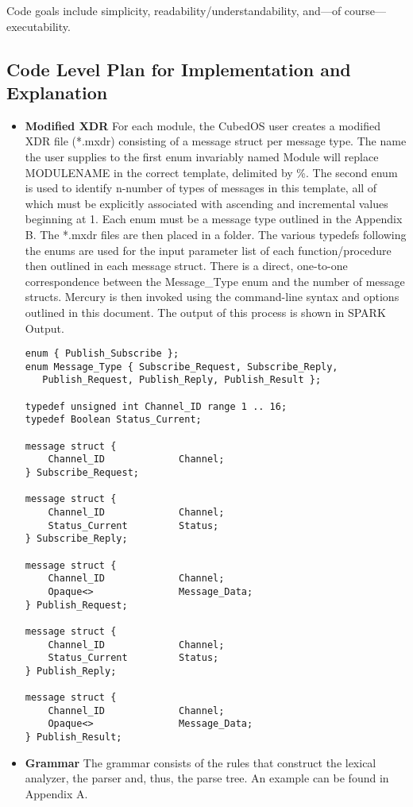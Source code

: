 Code goals include simplicity, readability/understandability, and—of course—executability.

\subsection{Code Level Plan for Implementation and Explanation}

\begin{itemize}
\item \textbf{Modified XDR} For each module, the CubedOS user creates a modified XDR file
(*.mxdr) consisting of a message struct per message type. The name the user supplies to the
first enum invariably named Module will replace MODULENAME in the correct template, delimited by
\%. The second enum is used to identify n-number of types of messages in this template, all of
which must be explicitly associated with ascending and incremental values beginning at 1. Each
enum must be a message type outlined in the Appendix B. The *.mxdr files are then placed in a
folder. The various typedefs following the enums are used for the input parameter list of each
function/procedure then outlined in each message struct. There is a direct, one-to-one
correspondence between the Message\_Type enum and the number of message structs. Mercury is then
invoked using the command-line syntax and options outlined in this document. The output of this
process is shown in SPARK Output.
\begin{verbatim}
enum { Publish_Subscribe };
enum Message_Type { Subscribe_Request, Subscribe_Reply, 
   Publish_Request, Publish_Reply, Publish_Result };

typedef unsigned int Channel_ID range 1 .. 16;
typedef Boolean Status_Current;

message struct {
    Channel_ID             Channel;
} Subscribe_Request;

message struct {
    Channel_ID             Channel;
    Status_Current         Status;
} Subscribe_Reply;

message struct {
    Channel_ID             Channel;
    Opaque<>               Message_Data;
} Publish_Request;

message struct {
    Channel_ID             Channel;
    Status_Current         Status;
} Publish_Reply;

message struct {
    Channel_ID             Channel;
    Opaque<>               Message_Data;
} Publish_Result;
\end{verbatim}
  
\item \textbf{Grammar} The grammar consists of the rules that construct the lexical analyzer,
the parser and, thus, the parse tree. An example can be found in Appendix A.


\end{itemize}
